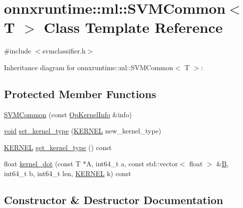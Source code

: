 \hypertarget{classonnxruntime_1_1ml_1_1SVMCommon}{}\section{onnxruntime\+:\+:ml\+:\+:S\+V\+M\+Common$<$ T $>$ Class Template Reference}
\label{classonnxruntime_1_1ml_1_1SVMCommon}


{\ttfamily \#include $<$svmclassifier.\+h$>$}



Inheritance diagram for onnxruntime\+:\+:ml\+:\+:S\+V\+M\+Common$<$ T $>$\+:
\subsection*{Protected Member Functions}
\begin{DoxyCompactItemize}
\item 
\mbox{\hyperlink{classonnxruntime_1_1ml_1_1SVMCommon_a7c8c7c6a0cbb52fa78c64b6e35226022}{S\+V\+M\+Common}} (const \mbox{\hyperlink{classonnxruntime_1_1OpKernelInfo}{Op\+Kernel\+Info}} \&info)
\item 
\mbox{\hyperlink{mlasi_8h_a88f941d423cb2a819b70a1358982b1a6}{void}} \mbox{\hyperlink{classonnxruntime_1_1ml_1_1SVMCommon_a06ce69d078cd9ecd44cb31cdd3109a7e}{set\+\_\+kernel\+\_\+type}} (\mbox{\hyperlink{namespaceonnxruntime_1_1ml_a3b945a42c5d7da1297e6b831fe7ae807}{K\+E\+R\+N\+EL}} new\+\_\+kernel\+\_\+type)
\item 
\mbox{\hyperlink{namespaceonnxruntime_1_1ml_a3b945a42c5d7da1297e6b831fe7ae807}{K\+E\+R\+N\+EL}} \mbox{\hyperlink{classonnxruntime_1_1ml_1_1SVMCommon_a46d33c53c4260a2cdae57563385e79f1}{get\+\_\+kernel\+\_\+type}} () const
\item 
float \mbox{\hyperlink{classonnxruntime_1_1ml_1_1SVMCommon_a90f1459ad4ae620be527218ad2a738ad}{kernel\+\_\+dot}} (const T $\ast$A, int64\+\_\+t a, const std\+::vector$<$ float $>$ \&\mbox{\hyperlink{mlasi_8h_a472f4360dfbf830e5135980ff43484b9}{B}}, int64\+\_\+t b, int64\+\_\+t len, \mbox{\hyperlink{namespaceonnxruntime_1_1ml_a3b945a42c5d7da1297e6b831fe7ae807}{K\+E\+R\+N\+EL}} k) const
\end{DoxyCompactItemize}


\subsection{Constructor \& Destructor Documentation}
\mbox{\label{classonnxruntime_1_1ml_1_1SVMCommon_a7c8c7c6a0cbb52fa78c64b6e35226022}} 
